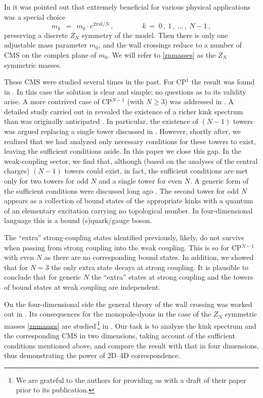 \documentclass[epsfig,12pt]{article}
\def\beq{\begin{equation}}
\def\eeq{\end{equation}}
\def\beq{\begin{equation}}
\def\eeq{\end{equation}}
\begin{document}
	In \cite{Gorsky} it was pointed out that extremely beneficial for various physical applications 
	was a special choice 
\beq
\label{znmasses}
	m_k ~~=~~ m_0 \cdot e^{2 \pi i k / N}\,,\qquad\qquad k~=~0\,,~1\,,~ ...\,,~ N-1\,,
\eeq
	preserving a discrete $Z_N$ symmetry of the model. 
	Then there is only one adjustable mass parameter $m_0$,
	and the  wall crossings reduce to a number of CMS on the complex plane of $m_0$.
	We will refer to \eqref{znmasses} as the $Z_N$ symmetric masses.

	These CMS were studied several times in the past. For CP$^1$ the result was found in \cite{SVZw}.
	In this case the solution is clear and simple; no questions as to its validity arise.
	A more contrived case of 
	CP$^{N-1}$ (with $N\geq 3$) was addressed in \cite{5,Bolokhov:2011mp}. 
	A detailed study carried out in \cite{Bolokhov:2011mp} revealed
	the existence of a richer kink spectrum than was originally anticipated \cite{Dorey:1998yh}. 
	In particular, the existence of $(N-1)$ towers was argued replacing  a single tower discussed in \cite{Dorey:1998yh}. 
	However, shortly after, we realized
	that we had analyzed only necessary conditions for these towers to exist, leaving the sufficient conditions aside.
	In this paper we close this gap. 
	In the weak-coupling sector, we find that, although (based on the analyses of the central charges) $(N-1)$ towers could exist, 
	in fact, the sufficient conditions are met only for two towers for odd $N$ and a single tower for even $N$. 
	A generic form of the sufficient conditions were discussed long ago \cite{Dorey:1999zk}.
	The second tower for odd $N$ appears as a collection of bound states of the appropriate kinks with a quantum of
	an elementary excitation carrying no topological number.  In four-dimensional language this is a bound (s)quark/gauge boson.

	The ``extra'' strong-coupling states identified previously, likely, do not survive when passing from strong coupling
	into the weak coupling.
	This is so for CP$^{N-1}$ with even $ N $ as there are no corresponding bound states.
	In addition, we showed that for $ N = 3 $ the only extra state decays at strong coupling.
	It is plausible to conclude that for generic $ N $ the ``extra'' states at strong coupling
	and the towers of bound states at weak coupling are independent.

	On the four-dimensional side the general theory of the wall crossing was worked out in \cite{koso}. 
	Its consequences for the monopole-dyons in the case of the $Z_N$ symmetric masses \eqref{znmasses}
	are studied\,\footnote{We are grateful to the authors for providing us with a draft of their paper prior to its publication.}
	in \cite{ndkp}. 
	Our task is to analyze the kink spectrum and the corresponding CMS in two dimensions, 
	taking account of the sufficient conditions mentioned above, 
	and compare the result with that in four dimensions, 
	thus  demonstrating the power of 2D--4D correspondence.
	
\end{document}
